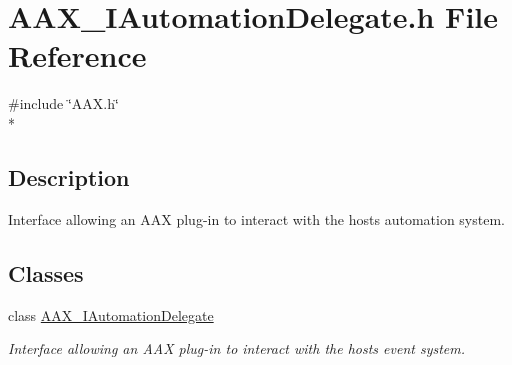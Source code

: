 \hypertarget{a00235}{}\section{A\+A\+X\+\_\+\+I\+Automation\+Delegate.\+h File Reference}
\label{a00235}
{\ttfamily \#include \char`\"{}A\+A\+X.\+h\char`\"{}}\\*


\subsection{Description}
Interface allowing an A\+A\+X plug-\/in to interact with the host\textquotesingle{}s automation system. 

\subsection*{Classes}
\begin{DoxyCompactItemize}
\item 
class \hyperlink{a00086}{A\+A\+X\+\_\+\+I\+Automation\+Delegate}
\begin{DoxyCompactList}\small\item\em Interface allowing an A\+A\+X plug-\/in to interact with the host\textquotesingle{}s event system. \end{DoxyCompactList}\end{DoxyCompactItemize}
